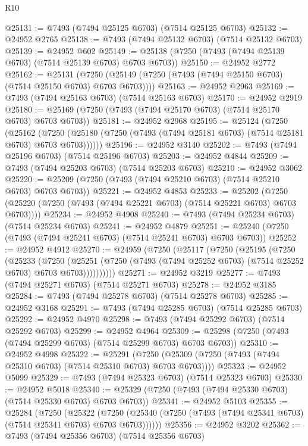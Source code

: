 \begin{lexlean}{R10}
\begin{coremodule}
@25131 := @7493 (@7494 @25125 @6703) (@7514 @25125 @6703)
@25132 := @24952 @2765
@25138 := @7493 (@7494 @25132 @6703) (@7514 @25132 @6703)
@25139 := @24952 @602
@25149 := @25138 (@7250 (@7493 (@7494 @25139 @6703) (@7514 @25139 @6703) @6703 @6703))
@25150 := @24952 @2772
@25162 := @25131
    (@7250 (@25149 (@7250 (@7493 (@7494 @25150 @6703) (@7514 @25150 @6703) @6703 @6703))))
@25163 := @24952 @2963
@25169 := @7493 (@7494 @25163 @6703) (@7514 @25163 @6703)
@25170 := @24952 @2919
@25180 := @25169 (@7250 (@7493 (@7494 @25170 @6703) (@7514 @25170 @6703) @6703 @6703))
@25181 := @24952 @2968
@25195 := @25124
    (@7250
      (@25162
        (@7250 (@25180 (@7250 (@7493 (@7494 @25181 @6703) (@7514 @25181 @6703) @6703 @6703))))))
@25196 := @24952 @3140
@25202 := @7493 (@7494 @25196 @6703) (@7514 @25196 @6703)
@25203 := @24952 @4844
@25209 := @7493 (@7494 @25203 @6703) (@7514 @25203 @6703)
@25210 := @24952 @3062
@25220 := @25209 (@7250 (@7493 (@7494 @25210 @6703) (@7514 @25210 @6703) @6703 @6703))
@25221 := @24952 @4853
@25233 := @25202
    (@7250 (@25220 (@7250 (@7493 (@7494 @25221 @6703) (@7514 @25221 @6703) @6703 @6703))))
@25234 := @24952 @4908
@25240 := @7493 (@7494 @25234 @6703) (@7514 @25234 @6703)
@25241 := @24952 @4879
@25251 := @25240 (@7250 (@7493 (@7494 @25241 @6703) (@7514 @25241 @6703) @6703 @6703))
@25252 := @24952 @4912
@25270 := @24959
    (@7250
      (@25117
        (@7250
          (@25195
            (@7250
              (@25233
                (@7250
                  (@25251
                    (@7250 (@7493 (@7494 @25252 @6703) (@7514 @25252 @6703) @6703 @6703))))))))))
@25271 := @24952 @3219
@25277 := @7493 (@7494 @25271 @6703) (@7514 @25271 @6703)
@25278 := @24952 @3185
@25284 := @7493 (@7494 @25278 @6703) (@7514 @25278 @6703)
@25285 := @24952 @3168
@25291 := @7493 (@7494 @25285 @6703) (@7514 @25285 @6703)
@25292 := @24952 @4970
@25298 := @7493 (@7494 @25292 @6703) (@7514 @25292 @6703)
@25299 := @24952 @4964
@25309 := @25298 (@7250 (@7493 (@7494 @25299 @6703) (@7514 @25299 @6703) @6703 @6703))
@25310 := @24952 @4998
@25322 := @25291
    (@7250 (@25309 (@7250 (@7493 (@7494 @25310 @6703) (@7514 @25310 @6703) @6703 @6703))))
@25323 := @24952 @5099
@25329 := @7493 (@7494 @25323 @6703) (@7514 @25323 @6703)
@25330 := @24952 @5018
@25340 := @25329 (@7250 (@7493 (@7494 @25330 @6703) (@7514 @25330 @6703) @6703 @6703))
@25341 := @24952 @5103
@25355 := @25284
    (@7250
      (@25322
        (@7250 (@25340 (@7250 (@7493 (@7494 @25341 @6703) (@7514 @25341 @6703) @6703 @6703))))))
@25356 := @24952 @3202
@25362 := @7493 (@7494 @25356 @6703) (@7514 @25356 @6703)

\end{coremodule}
\end{lexlean}
